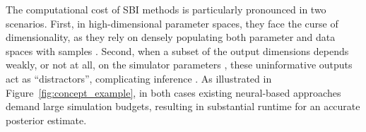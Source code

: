 \documentclass[twoside]{article}
\begin{document}
The computational cost of SBI methods is particularly pronounced in two scenarios.
First, in high-dimensional parameter spaces, they face the curse of dimensionality, as they rely on densely populating both parameter and data spaces with samples \citep{lintusaari2017fundamentals, sisson2018handbook}.
Second, when a subset of the output dimensions depends weakly, or not at all, on the simulator parameters \citep{Saltelli2008, MonsalveBravo2022}, these uninformative outputs act as ``distractors'', complicating inference \citep{lueckmann2021benchmarking}.
As illustrated in Figure~\ref{fig:concept_example}, in both cases existing neural-based approaches demand large simulation budgets, resulting in substantial runtime for an accurate posterior estimate.
\end{document}
